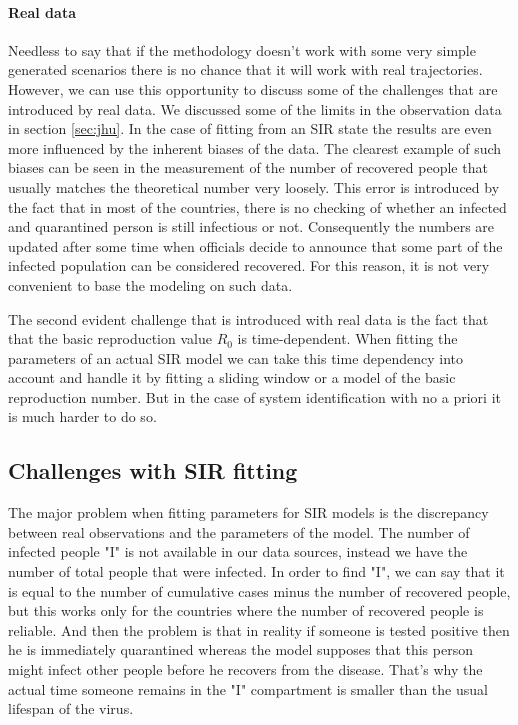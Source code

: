 \documentclass[12pt, letterpaper]{article}
\begin{document}
\paragraph{Real data} 
Needless to say that if the methodology doesn't work with some very simple generated scenarios there is no chance that it will work with real trajectories. 
However, we can use this opportunity to discuss some of the challenges that are introduced by real data.
We discussed some of the limits in the observation data in section \ref{sec:jhu}.
In the case of fitting from an SIR state the results are even more influenced by the inherent biases of the data.
The clearest example of such biases can be seen in the measurement of the number of recovered people that usually matches the theoretical number very loosely. 
This error is introduced by the fact that in most of the countries, there is no checking of whether an infected and quarantined person is still infectious or not.
Consequently the numbers are updated after some time when officials decide to announce that some part of the infected population can be considered recovered.
For this reason, it is not very convenient to base the modeling on such data.

The second evident challenge that is introduced with real data is the fact that that the basic reproduction value $R_0$ is time-dependent.
When fitting the parameters of an actual SIR model we can take this time dependency into account and handle it by fitting a sliding window or a model of the basic reproduction number.
But in the case of system identification with no a priori it is much harder to do so.

\subsection{Challenges with SIR fitting}\label{sec:sirdiscu}

The major problem when fitting parameters for SIR models is the discrepancy between real observations and the parameters of the model.
The number of infected people "I" is not available in our data sources, instead we have the number of total people that were infected. 
In order to find "I", we can say that it is equal to the number of cumulative cases minus the number of recovered people, but this works only for the countries where the number of recovered people is reliable.
And then the problem is that in reality if someone is tested positive then he is immediately quarantined whereas the model supposes that this person might infect other people before he recovers from the disease.
That's why the actual time someone remains in the "I" compartment is smaller than the usual lifespan of the virus.
\end{document}
